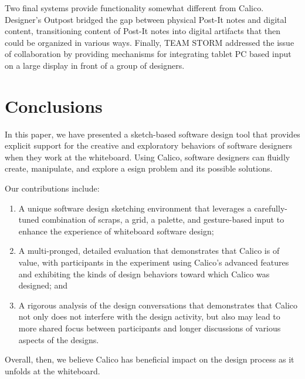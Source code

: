 Two final systems provide functionality somewhat different from Calico. Designer's Outpost \citep{Klemmer} bridged the gap between physical Post-It notes and digital content, transitioning content of Post-It notes into digital artifacts that then could be organized in various ways. Finally, TEAM STORM \citep{Hailpern} addressed the issue of collaboration by providing mechanisms for integrating tablet PC based input on a large display in front of a group of designers. 

\section{Conclusions}
\label{conclusions}

In this paper, we have presented a sketch-based software design tool that provides explicit support for the creative and exploratory behaviors of software designers when they work at the whiteboard. Using Calico, software designers can fluidly create, manipulate, and explore a esign problem and its possible solutions. 

Our contributions include: 
\begin{enumerate}

\item A unique software design sketching environment that leverages a carefully-tuned combination of scraps, a grid, a palette, and gesture-based input to enhance the experience of whiteboard software design; 
\item A multi-pronged, detailed evaluation that demonstrates that Calico is of value, with participants in the experiment using Calico's advanced features and exhibiting the kinds of design behaviors toward which Calico was designed; and 
\item A rigorous analysis of the design conversations that demonstrates that Calico not only does not interfere with the design activity, but also may lead to more shared focus between participants and longer discussions of various aspects of the designs.

\end{enumerate}
Overall, then, we believe Calico has beneficial impact on the design process as it unfolds at the whiteboard. 


